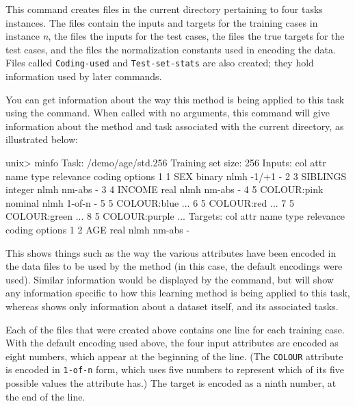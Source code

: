 This command creates files in the current directory pertaining to four
tasks instances.  The  files contain the inputs and
targets for the training cases in instance \textit{n}, the
 files the inputs for the test cases, the
 files the true targets for the test cases, and the
 files the normalization constants used in encoding
the data.  Files called \texttt{Coding-used} and
\texttt{Test-set-stats} are also created; they hold information used
by later commands.  

You can get information about the way this method is being applied to
this task using the \minfo{} command.  When called with no arguments,
this command will give information about the method and task
associated with the current directory, as illustrated below:

\begin{Session}
unix> minfo
Task: /demo/age/std.256
Training set size: 256
Inputs: 
 col attr name          type   relevance  coding  options
   1   1  SEX           binary   nlmh     -1/+1        -
   2   3  SIBLINGS      integer  nlmh     nm-abs       -
   3   4  INCOME        real     nlmh     nm-abs       -
   4   5  COLOUR:pink   nominal  nlmh     1-of-n       -
   5   5  COLOUR:blue                  ...
   6   5  COLOUR:red                   ...
   7   5  COLOUR:green                 ...
   8   5  COLOUR:purple                ...
Targets: 
 col attr name          type   relevance  coding  options
   1   2  AGE           real     nlmh     nm-abs       -
\end{Session}

This shows things such as the way the various attributes have been
encoded in the data files to be used by the method (in this case, the
default encodings were used).  Similar information would be displayed
by the \dinfo{} command, but \minfo{} will show any information specific
to how this learning method is being applied to this task, whereas \dinfo{}
shows only information about a dataset itself, and its associated tasks.

Each of the  files that were created above contains one
line for each training case.  With the default encoding used above,
the four input attributes are encoded as eight numbers, which appear
at the beginning of the line. (The \texttt{COLOUR} attribute is
encoded in \texttt{1-of-n} form, which uses five numbers to represent
which of its five possible values the attribute has.)  The target is
encoded as a ninth number, at the end of the line.

